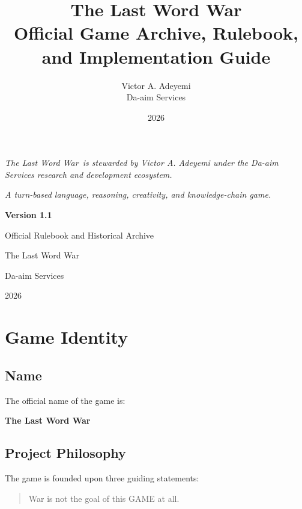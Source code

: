 \documentclass[11pt,a4paper]{article}
\title{\textbf{The Last Word War\texttrademark}\\
\large Official Game Archive, Rulebook, and Implementation Guide}
\author{
Victor A. Adeyemi\\
Da-aim Services
}
\date{2026}
\begin{document}
\maketitle

\begin{center}
\textit{
The Last Word War\texttrademark\ is stewarded by
Victor A. Adeyemi under the
Da-aim Services research and development ecosystem.
}
\end{center}

\vspace{1em}

\begin{center}
\textit{A turn-based language, reasoning, creativity, and knowledge-chain game.}
\end{center}

\begin{center}
\textbf{Version 1.1}

Official Rulebook and Historical Archive

The Last Word War\texttrademark

Da-aim Services

2026
\end{center}

\vspace{1em}

\tableofcontents

\newpage

\section{Game Identity}

\subsection{Name}

The official name of the game is:

\begin{center}
\textbf{The Last Word War\texttrademark}
\end{center}

\subsection{Project Philosophy}

The game is founded upon three guiding statements:

\begin{quote}
War is not the goal of this GAME at all.
\end{quote}
\end{document}
